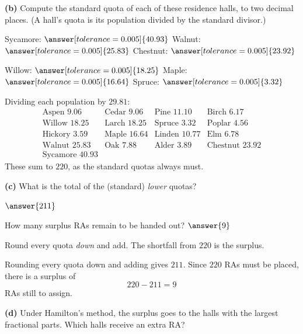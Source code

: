 \documentclass[12pt]{ximera}
\begin{document}
\begin{problem}
\begin{prompt}
\textbf{(b)} Compute the standard quota of each of these residence halls, to two
decimal places. (A hall's quota is its population divided by the standard divisor.)

Sycamore: $\answer[tolerance=0.005]{40.93}$ \qquad
Walnut: $\answer[tolerance=0.005]{25.83}$ \qquad
Chestnut: $\answer[tolerance=0.005]{23.92}$

\smallskip
Willow: $\answer[tolerance=0.005]{18.25}$ \qquad
Maple: $\answer[tolerance=0.005]{16.64}$ \qquad
Spruce: $\answer[tolerance=0.005]{3.32}$

\begin{feedback}
Dividing each population by $29.81$:
\[
\begin{array}{llll}
\text{Aspen } 9.06 & \text{Cedar } 9.06 & \text{Pine } 11.10 & \text{Birch } 6.17\\
\text{Willow } 18.25 & \text{Larch } 18.25 & \text{Spruce } 3.32 & \text{Poplar } 4.56\\
\text{Hickory } 3.59 & \text{Maple } 16.64 & \text{Linden } 10.77 & \text{Elm } 6.78\\
\text{Walnut } 25.83 & \text{Oak } 7.88 & \text{Alder } 3.89 & \text{Chestnut } 23.92\\
\text{Sycamore } 40.93 & & &
\end{array}
\]
These sum to $220$, as the standard quotas always must.
\end{feedback}
\end{prompt}

\begin{prompt}
\textbf{(c)} What is the total of the (standard) \emph{lower} quotas?

$\answer{211}$

\smallskip
How many surplus RAs remain to be handed out? $\answer{9}$

\begin{hint}
Round every quota \emph{down} and add. The shortfall from $220$ is the surplus.
\end{hint}

\begin{feedback}
Rounding every quota down and adding gives $211$. Since $220$ RAs must be placed, there
is a surplus of
\[ 220 - 211 = 9 \]
RAs still to assign.
\end{feedback}
\end{prompt}

\begin{prompt}
\textbf{(d)} Under Hamilton's method, the surplus goes to the halls with the largest
fractional parts. Which halls receive an extra RA?


\end{prompt}
\end{problem}
\end{document}
